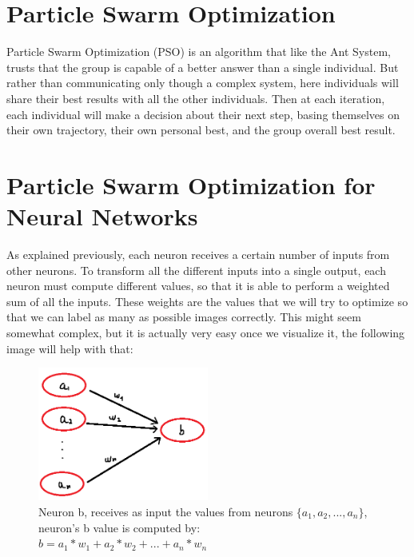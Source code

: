 \documentclass[a4paper]{article}
\begin{document}
\section{Particle Swarm Optimization}
Particle Swarm Optimization (PSO) is an algorithm that like the Ant System, trusts that the group is capable of a better answer than a single individual. But rather than communicating only though a complex system, here individuals will share their best results with all the other individuals. Then at each iteration, each individual will make a decision about their next step, basing themselves on their own trajectory, their own personal best, and the group overall best result. 
\section{Particle Swarm Optimization for Neural Networks}
As explained previously, each neuron receives a certain number of inputs from other neurons. To transform all the different inputs into a single output, each neuron must compute different values, so that it is able to perform a weighted sum of all the inputs. These weights are the values that we will try to optimize so that we can label as many as possible images correctly. This might seem somewhat complex, but it is actually very easy once we visualize it, the following image will help with that:

\begin{figure}[H]
\center
\includegraphics[width=0.5\textwidth]{images/neurons_f.PNG}
\caption{Neuron b, receives as input the values from neurons $\{a_1,a_2, ..., a_n\}$, neuron's b value is computed by:\\ $b = a_1 * w_1 + a_2 * w_2 + ... + a_n * w_n$}
\end{figure}
\end{document}
